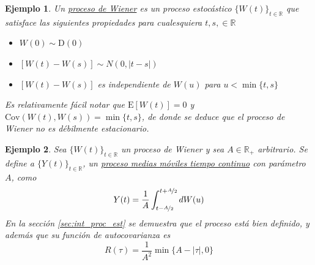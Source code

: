 \documentclass[12pt,letterpaper]{book}
\newtheorem{ejemplo}{Ejemplo}[chapter]
\newcommand{\R}{\mathbb{R}}
\newcommand{\SEN}[1]{\mathrm{sen}\left( #1 \right)}
\newcommand{\E}[1]{\mathrm{E}\left[ #1 \right]}
\newcommand{\Cov}[1]{\mathrm{Cov}\left( #1 \right)}
\newcommand{\abso}[1]{\left| #1 \right|}
\begin{document}
%

\begin{ejemplo}
Un \underline{proceso de Wiener} es un proceso estocástico $\{ W(t)\}_{t\in\R}$ que satisface las siguientes propiedades para cualesquiera $t, s, \in \R$
\begin{itemize}
\item $W(0) \sim \text{D}(0)$
\item $\left[W(t)-W(s)\right] \sim N(0, \abso{t-s})$
\item $\left[W(t)-W(s)\right]$ es independiente de $W(u)$ para $u < \min\{ t, s \}$
\end{itemize}

Es relativamente fácil notar que $\E{W(t)} = 0$ y $\Cov{W(t),W(s)} = \min\{t,s\}$, de donde se deduce que el proceso de Wiener no es débilmente estacionario.
\end{ejemplo}

\begin{ejemplo}
\label{ejemplo:ma}
Sea $\{ W(t)\}_{t\in\R}$ un proceso de Wiener y sea $A\in\R_+$ arbitrario. Se define a $\{Y(t)\}_{t\in\R}$, un \underline{proceso medias m\'oviles tiempo continuo} con parámetro $A$, como
\begin{equation}
Y(t) = \frac{1}{A}\int_{t-\nicefrac{A}{2}}^{t+\nicefrac{A}{2}} dW(u)
\end{equation}
En la sección \ref{sec:int_proc_est} se demuestra que el proceso está bien definido, y además que su función de autocovarianza es
\begin{equation}
R(\tau) = \frac{1}{A^2}\min\{ A - \abso{\tau} , 0 \}
\end{equation}
\end{ejemplo}
\end{document}
